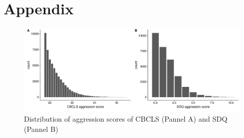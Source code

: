 \section{Appendix}
\label{sec:appendix_longhera}

\begin{figure}[htpb]
  \centering
  \includegraphics[width=0.7\linewidth]{longHera/figure/aggression_hist_score.pdf}
  \caption[Distribution of aggression scores]{Distribution of aggression scores of CBCLS (Pannel A) and SDQ (Pannel B)}\label{fig:hist_aggression}
\end{figure}
